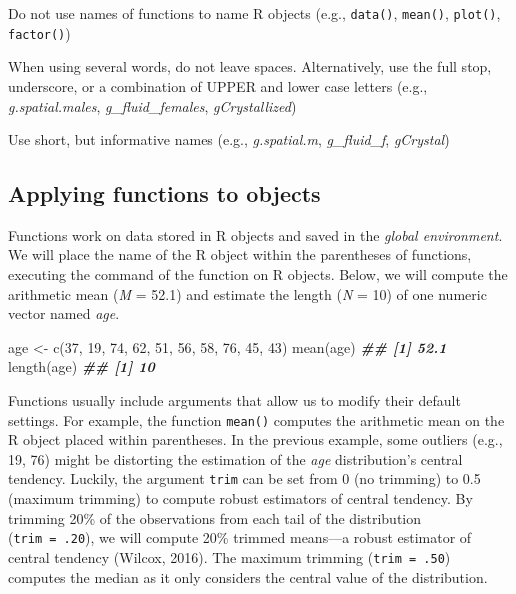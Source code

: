 \documentclass[
]{book}
\newenvironment{Shaded}{\begin{snugshade}}{\end{snugshade}}
\newcommand{\DecValTok}[1]{\textcolor[rgb]{0.00,0.00,0.81}{#1}}
\newcommand{\DocumentationTok}[1]{\textcolor[rgb]{0.56,0.35,0.01}{\textbf{\textit{#1}}}}
\newcommand{\FunctionTok}[1]{\textcolor[rgb]{0.00,0.00,0.00}{#1}}
\newcommand{\NormalTok}[1]{#1}
\newcommand{\OtherTok}[1]{\textcolor[rgb]{0.56,0.35,0.01}{#1}}
\theoremstyle{definition}
\theoremstyle{definition}
\theoremstyle{definition}
\theoremstyle{definition}
\theoremstyle{remark}
\begin{document}
Do not use names of functions to name R objects (e.g., \texttt{data()}, \texttt{mean()}, \texttt{plot()}, \texttt{factor()})

When using several words, do not leave spaces. Alternatively, use the full stop, underscore, or a combination of UPPER and lower case letters (e.g., \emph{g.spatial.males}, \emph{g\_fluid\_females}, \emph{gCrystallized})

Use short, but informative names (e.g., \emph{g.spatial.m}, \emph{g\_fluid\_f}, \emph{gCrystal})

\hypertarget{applying-functions-to-objects}{%
\subsection{Applying functions to objects}\label{applying-functions-to-objects}}

Functions work on data stored in R objects and saved in the \emph{global environment}. We will place the name of the R object within the parentheses of functions, executing the command of the function on R objects. Below, we will compute the arithmetic mean (\emph{M} = 52.1) and estimate the length (\emph{N} = 10) of one numeric vector named \emph{age}.

\begin{Shaded}
\begin{Highlighting}[]

\NormalTok{age }\OtherTok{\textless{}{-}} \FunctionTok{c}\NormalTok{(}\DecValTok{37}\NormalTok{, }\DecValTok{19}\NormalTok{, }\DecValTok{74}\NormalTok{, }\DecValTok{62}\NormalTok{, }\DecValTok{51}\NormalTok{, }\DecValTok{56}\NormalTok{, }\DecValTok{58}\NormalTok{, }\DecValTok{76}\NormalTok{, }\DecValTok{45}\NormalTok{, }\DecValTok{43}\NormalTok{)}
\FunctionTok{mean}\NormalTok{(age)}
\DocumentationTok{\#\# [1] 52.1}
\FunctionTok{length}\NormalTok{(age)}
\DocumentationTok{\#\# [1] 10}
\end{Highlighting}
\end{Shaded}

Functions usually include arguments that allow us to modify their default settings. For example, the function \texttt{mean()} computes the arithmetic mean on the R object placed within parentheses. In the previous example, some outliers (e.g., 19, 76) might be distorting the estimation of the \emph{age} distribution's central tendency. Luckily, the argument \texttt{trim} can be set from 0 (no trimming) to 0.5 (maximum trimming) to compute robust estimators of central tendency. By trimming 20\% of the observations from each tail of the distribution (\texttt{trim\ =\ .20}), we will compute 20\% trimmed means---a robust estimator of central tendency (Wilcox, 2016). The maximum trimming (\texttt{trim\ =\ .50}) computes the median as it only considers the central value of the distribution.
\end{document}
